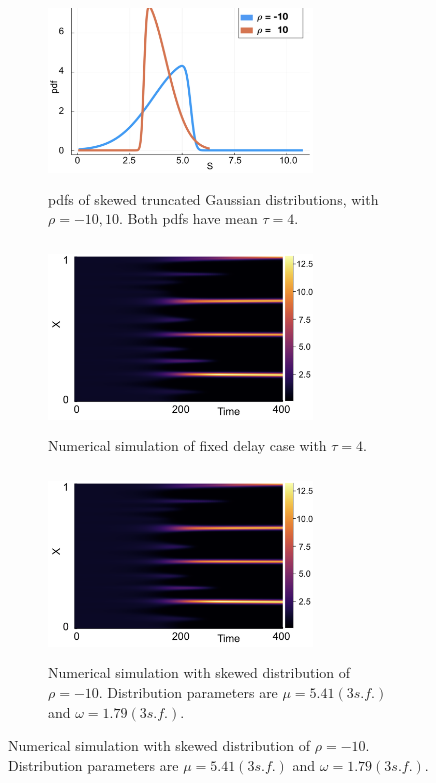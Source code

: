 \begin{figure}[H]
    \centering
    \begin{subfigure}[t]{0.45\textwidth}
        \centering
        \includegraphics[width=7cm,height=5cm]{distt4.png}
        \caption{pdfs of skewed truncated Gaussian distributions, with $\rho=-10,10$. Both pdfs have mean $\tau=4$.}
        \label{}
    \end{subfigure}
    \hfill
    \begin{subfigure}[t]{0.45\textwidth}
        \centering
        \includegraphics[width=7cm,height=5cm]{fixt4.png}
        \caption{Numerical simulation of fixed delay case with $\tau=4.$}
        \label{}
    \end{subfigure}
    \hfill
    \begin{subfigure}[t]{0.45\textwidth}
        \centering
        \includegraphics[width=7cm,height=5cm]{fixt4.png}
        \caption{Numerical simulation with skewed distribution of $\rho=-10$. Distribution parameters are $\mu=5.41(3 s.f.)$ and $\omega=1.79(3 s.f.)$.}
        \label{}

\end{subfigure}
\end{figure}
